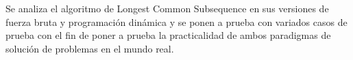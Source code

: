 Se analiza el algoritmo de Longest Common Subsequence en sus versiones de fuerza bruta y programación dinámica y se ponen a prueba con variados casos de prueba con el fin de poner a prueba la practicalidad de ambos paradigmas de solución de problemas en el mundo real.